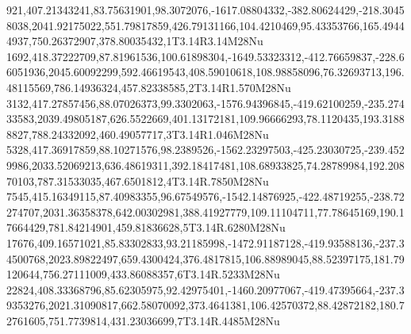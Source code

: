 921,407.21343241,83.75631901,98.3072076,-1617.08804332,-382.80624429,-218.30458038,2041.92175022,551.79817859,426.79131166,104.4210469,95.43353766,165.49444937,750.26372907,378.80035432,1T3.14R3.14M28Nu
1692,418.37222709,87.81961536,100.61898304,-1649.53323312,-412.76659837,-228.66051936,2045.60092299,592.46619543,408.59010618,108.98858096,76.32693713,196.48115569,786.14936324,457.82338585,2T3.14R1.570M28Nu
3132,417.27857456,88.07026373,99.3302063,-1576.94396845,-419.62100259,-235.27433583,2039.49805187,626.5522669,401.13172181,109.96666293,78.1120435,193.31888827,788.24332092,460.49057717,3T3.14R1.046M28Nu
5328,417.36917859,88.10271576,98.2389526,-1562.23297503,-425.23030725,-239.4529986,2033.52069213,636.48619311,392.18417481,108.68933825,74.28789984,192.20870103,787.31533035,467.6501812,4T3.14R.7850M28Nu
7545,415.16349115,87.40983355,96.67549576,-1542.14876925,-422.48719255,-238.72274707,2031.36358378,642.00302981,388.41927779,109.11104711,77.78645169,190.17664429,781.84214901,459.81836628,5T3.14R.6280M28Nu
17676,409.16571021,85.83302833,93.21185998,-1472.91187128,-419.93588136,-237.34500768,2023.89822497,659.4300424,376.4817815,106.88989045,88.52397175,181.79120644,756.27111009,433.86088357,6T3.14R.5233M28Nu
22824,408.33368796,85.62305975,92.42975401,-1460.20977067,-419.47395664,-237.39353276,2021.31090817,662.58070092,373.4641381,106.42570372,88.42872182,180.72761605,751.7739814,431.23036699,7T3.14R.4485M28Nu
